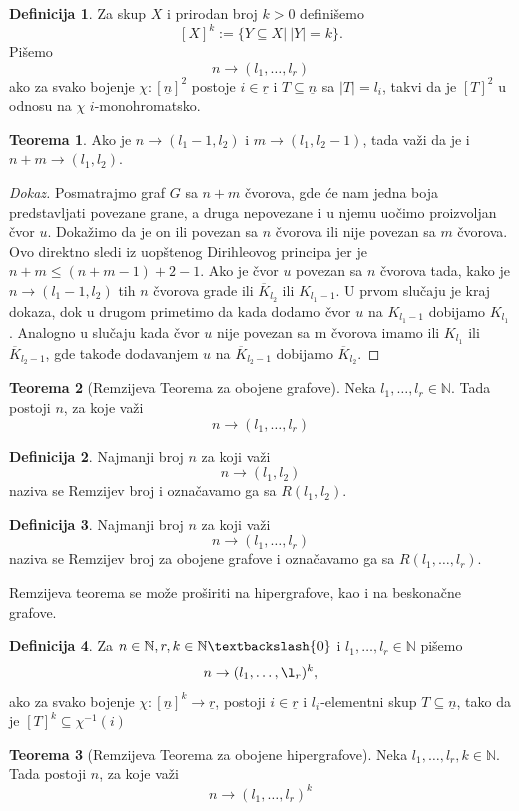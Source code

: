 \documentclass{article}
\theoremstyle{definition}
\newtheorem{definicija}{Definicija}[section]
\newtheorem{teorema}{Teorema}[section]
\newcommand{\dokaz}[1]{\begin{proof}[Dokaz]#1\end{proof}}
\begin{document}
	\begin{definicija}
		Za skup $X$ i prirodan broj $k>0$ definišemo
		\[
		[X]^k :=\{Y\subseteq X | \:|Y|=k\}.
		\]
		Pišemo
		\[
		n\rightarrow (l_1,\ldots,l_r)
		\]
		ako za svako bojenje $\chi:[\underline{n}]^2$ postoje $i\in \underline{r}$ i $T\subseteq \underline{n}$ sa $|T|=l_i$, takvi da je $[T]^2$ u odnosu na $\chi$ $i$-monohromatsko.	
	\end{definicija}
	\begin{teorema}
	Ako je $n \rightarrow (l_1 - 1, l_2)$ i $m \rightarrow (l_1, l_2 - 1)$, tada važi da je i $n + m \rightarrow (l_1,l_2)$.
	\dokaz{
		Posmatrajmo graf $G$ sa $n + m$ čvorova, gde će nam jedna boja predstavljati povezane grane, a druga nepovezane i u njemu uočimo 					proizvoljan čvor $u$. Dokažimo da je on ili povezan sa $n$ čvorova ili nije povezan sa $m$ čvorova.  Ovo direktno sledi iz uopštenog Dirihleovog 				principa jer je $n + m \leq (n + m - 1) + 2 - 1$. Ako je čvor $u$ povezan sa $n$ čvorova tada, kako je $n \rightarrow (l_1 - 1, l_2)$ tih $n$ 				čvorova grade ili $\overline K_{l_2}$ ili $K_{l_1 - 1}$. U prvom slučaju je kraj dokaza, dok u drugom primetimo da kada dodamo čvor $u$ na 
		$K_{l_1 - 1}$ dobijamo $K_{l_1}$. Analogno u slučaju kada čvor $u$ nije povezan sa m čvorova imamo ili $K_{l_1}$ ili $\overline K_{l_2 - 1}$, 				gde takođe dodavanjem $u$ na $\overline K_{l_2 - 1}$ dobijamo $\overline K_{l_2}$.
	}
	\end{teorema}
	\begin{teorema}[Remzijeva Teorema za obojene grafove]
		Neka $l_1,\ldots, l_r \in \mathbb{N}$. Tada postoji $n$, za koje važi
		\[
		n\rightarrow(l_1,\ldots,l_r)
		\]
	\end{teorema}
	
	\begin{definicija}
		Najmanji broj $n$ za koji važi
		\[
		n\rightarrow(l_1,l_2)
		\]
		naziva se Remzijev broj i označavamo ga sa $R(l_1,l_2)$.
	\end{definicija}
	
	\begin{definicija}
		Najmanji broj $n$ za koji važi
		\[
		n\rightarrow(l_1,\ldots,l_r)
		\]
		naziva se Remzijev broj za obojene grafove i označavamo ga sa $R(l_1,\ldots,l_r)$.
	\end{definicija}

	Remzijeva teorema se može proširiti na hipergrafove, kao i na beskonačne grafove.
	
	\begin{definicija}
		Za $n \in \mathbb{N},r,k\in \mathbb{N}\textbackslash \{0\}$ i $l_1,\ldots,l_r \in \mathbb{N}$ pišemo
		\[
			n \rightarrow (l_1,\ldots,\l_r)^k,
		\]
		ako za svako bojenje $\chi:[\underline{n}]^k\rightarrow \underline{r}$, postoji $i \in \underline{r}$ i $l_i$-elementni skup $T\subseteq \underline{n}$, tako da je $[T]^k \subseteq \chi^{-1}(i)$
	\end{definicija}
	\begin{teorema}[Remzijeva Teorema za obojene hipergrafove]
		Neka $l_1,\ldots,l_r,k \in \mathbb{N}$. Tada postoji $n$, za koje važi
		\[
		n\rightarrow(l_1,\ldots,l_r)^k
		\]
	\end{teorema}
	
\end{document}
